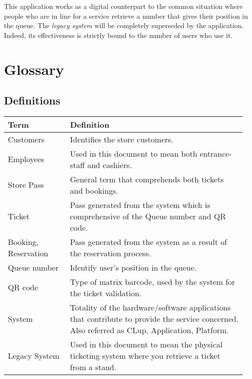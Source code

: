 This application works as a digital counterpart to the common situation where people who are in line for a service retrieve a number that gives their position in the queue. The \textit{legacy system} will be completely superseded by the application. Indeed, its effectiveness is strictly bound to the number of users who use it.

\section{Glossary}
\subsection{Definitions}
\begin{center}
	\begin{tabular}{@{}p{0.25\linewidth} p{0.71\linewidth}@{}}
		\toprule
		\textbf{Term} & \textbf{Definition}\\
		\midrule
		Customers &  Identifies the store customers.\\
		Employees & Used in this document to mean both entrance-staff and cashiers.\\
		Store Pass & General term that comprehends both tickets and bookings.\\
		Ticket & Pass generated from the system which is comprehensive of the Queue number and QR code.\\
		Booking, Reservation & Pass generated from the system as a result of the reservation process.\\
		Queue number & Identify user's position in the queue.\\
		QR code & Type of matrix barcode, used by the system for the ticket validation.\\
		System & Totality of the hardware/software applications that contribute to provide the service concerned. Also referred as CLup, Application, Platform.\\
		Legacy System & Used in this document to mean the physical ticketing system where you retrieve a ticket from a stand.\\
		\bottomrule
	\end{tabular}
\end{center}

